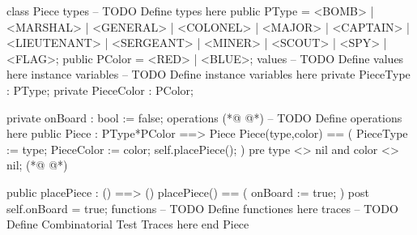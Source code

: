 \begin{vdmpp}[breaklines=true]
class Piece
types
-- TODO Define types here
   public PType = <BOMB> | <MARSHAL> | <GENERAL> | <COLONEL> | <MAJOR> | <CAPTAIN> | <LIEUTENANT> | <SERGEANT> | <MINER> | <SCOUT> | <SPY> | <FLAG>;
  public PColor = <RED> | <BLUE>;
values
 -- TODO Define values here
instance variables
-- TODO Define instance variables here
  private PieceType : PType;
  private PieceColor : PColor;
  
  private onBoard : bool := false;
operations
(*@
\label{Piece:15}
@*)
-- TODO Define operations here
  public Piece : PType*PColor ==> Piece
    Piece(type,color) ==
    (
     PieceType := type;
     PieceColor := color;
     self.placePiece();
    )
    pre type <> nil and color <> nil;
(*@
\label{placePiece:24}
@*)
   
   public placePiece : () ==> ()
    placePiece() ==
    (
     onBoard := true;
    )
    post self.onBoard = true;
functions
-- TODO Define functiones here
traces
-- TODO Define Combinatorial Test Traces here
end Piece
\end{vdmpp}
